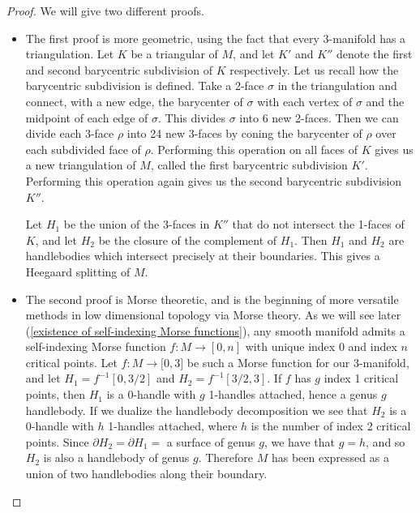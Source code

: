 \begin{proof}
We will give two different proofs.

\begin{itemize}

	\item The first proof is more geometric, using the fact that every 3-manifold has a triangulation. Let $K$ be a triangular of $M$, and let $K'$ and $K''$ denote the first and second barycentric subdivision of $K$ respectively. Let us recall how the barycentric subdivision is defined. Take a 2-face $\sigma$ in the triangulation and connect, with a new edge, the barycenter of $\sigma$ with each vertex of $\sigma$ and the midpoint of each edge of $\sigma$. This divides $\sigma$ into 6 new 2-faces. Then we can divide each 3-face $\rho$ into 24 new 3-faces by coning the barycenter of $\rho$ over each subdivided face of $\rho$. Performing this operation on all faces of $K$ gives us a new triangulation of $M$, called the first barycentric subdivision $K'$. Performing this operation again gives us the second barycentric subdivision $K''$.
	
	Let $H_1$ be the union of the 3-faces in $K''$ that do not intersect the 1-faces of $K$, and let $H_2$ be the closure of the complement of $H_1$. Then $H_1$ and $H_2$ are handlebodies which intersect precisely at their boundaries. This gives a Heegaard splitting of $M$.
	
	\item The second proof is Morse theoretic, and is the beginning of more versatile methods in low dimensional topology via Morse theory. As we will see later (\cref{existence of self-indexing Morse functions}), any smooth manifold admits a self-indexing Morse function $f : M \rightarrow [0,n]$ with unique index 0 and index $n$ critical points. Let $f : M \rightarrow \mathbb [0,3]$ be such a Morse function for our 3-manifold, and let $H_1 = f^{-1}[0,3/2]$ and $H_2=f^{-1}[3/2,3]$. If $f$ has $g$ index 1 critical points, then $H_1$ is a 0-handle with $g$ 1-handles attached, hence a genus $g$ handlebody. If we dualize the handlebody decomposition we see that $H_2$ is a 0-handle with $h$ 1-handles attached, where $h$ is the number of index 2 critical points. Since $\partial H_2 = \partial H_1 = $ a surface of genus $g$, we have that $g=h$, and so $H_2$ is also a handlebody of genus $g$. Therefore $M$ has been expressed as a union of two handlebodies along their boundary.
	
\end{itemize}
\end{proof}


